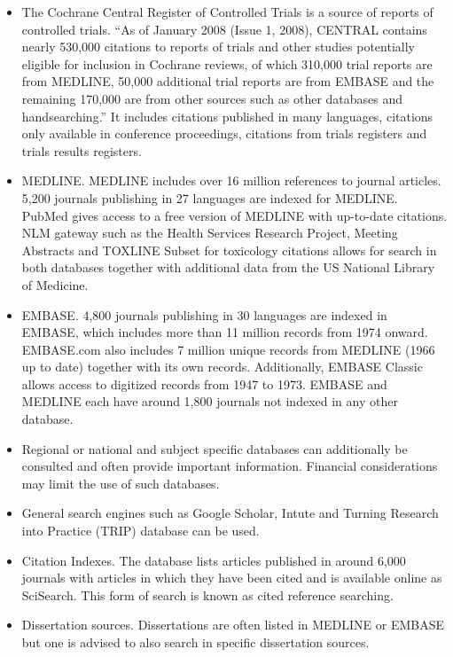 \documentclass[11pt,a4paper,twoside]{book}\usepackage[]{graphicx}\usepackage[]{color}
\begin{document}
\begin{itemize}
\item The Cochrane Central Register of Controlled Trials is a source of reports of controlled trials. ``As of January 2008 (Issue 1, 2008), CENTRAL contains nearly 530,000 citations to reports of trials and other studies potentially eligible for inclusion in Cochrane reviews, of which 310,000 trial reports are from MEDLINE, 50,000 additional trial reports are from EMBASE and the remaining 170,000 are from other sources such as other databases and handsearching.'' It includes citations published in many languages, citations only available in conference proceedings, citations from trials registers and trials results registers.
\item MEDLINE. MEDLINE includes over 16 million references to journal articles. 5,200 journals publishing in 27 languages are indexed for MEDLINE. PubMed gives access to a free version of MEDLINE with up-to-date citations. NLM gateway such as the Health Services Research Project, Meeting Abstracts and TOXLINE Subset for toxicology citations allows for search in both databases together with additional data from the US National Library of Medicine.
\item EMBASE. 4,800 journals publishing in 30 languages are indexed in EMBASE, which includes more than 11 million records from 1974 onward. EMBASE.com also includes 7 million unique records from MEDLINE (1966 up to date) together with its own records. Additionally, EMBASE Classic allows access to digitized records from 1947 to 1973. EMBASE and MEDLINE each have around 1,800 journals not indexed in any other database.
\item Regional or national and subject specific databases can additionally be consulted and often provide important information. Financial considerations may limit the use of such databases.
\item General search engines such as Google Scholar, Intute and Turning Research into Practice (TRIP) database can be used.
\item Citation Indexes. The database lists articles published in around 6,000 journals with articles in which they have been cited and is available online as SciSearch. This form of search is known as cited reference searching.
\item Dissertation sources. Dissertations are often listed in MEDLINE or EMBASE but one is advised to also search in specific dissertation sources.

\end{itemize}
\end{document}
